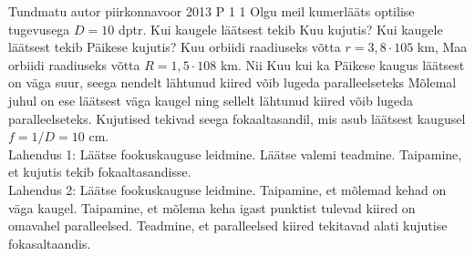 {Tundmatu autor} %
{piirkonnavoor} %
{2013} %
{P 1} %
{1} %
{
\ifStatement
Olgu meil kumerlääts optilise tugevusega $D = 10$ dptr. Kui kaugele läätsest tekib Kuu kujutis? Kui kaugele läätsest tekib Päikese kujutis? Kuu orbiidi raadiuseks võtta $r = 3,8 \cdot 105$ km, Maa orbiidi raadiuseks võtta $R = 1,5 \cdot 108$ km.
\fi
\ifHint
Nii Kuu kui ka Päikese kaugus läätsest on väga suur, seega nendelt lähtunud kiired võib lugeda paralleelseteks
\fi
\ifSolution
Mõlemal juhul on ese läätsest väga kaugel ning sellelt lähtunud kiired võib lugeda paralleelseteks. Kujutised tekivad seega fokaaltasandil, mis asub läätsest kaugusel $f = 1/D = 10$ cm. \\
Lahendus 1: Läätse fookuskauguse leidmine. Läätse valemi teadmine. Taipamine, et kujutis tekib fokaaltasandisse.\\
Lahendus 2: Läätse fookuskauguse leidmine. Taipamine, et mõlemad kehad on väga kaugel. Taipamine, et mõlema keha igast punktist tulevad kiired on omavahel paralleelsed. Teadmine, et paralleelsed kiired tekitavad alati kujutise fokasaltaandis.
\fi
}
 
